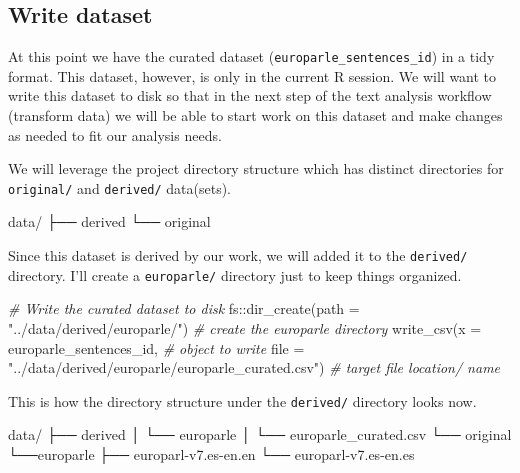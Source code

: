 \documentclass[
  letterpaper,
]{scrbook}
\newenvironment{Shaded}{\begin{snugshade}}{\end{snugshade}}
\newcommand{\AttributeTok}[1]{\textcolor[rgb]{0.00,0.00,0.00}{#1}}
\newcommand{\CommentTok}[1]{\textcolor[rgb]{0.00,0.00,0.00}{\textit{#1}}}
\newcommand{\ExtensionTok}[1]{\textcolor[rgb]{0.00,0.00,0.00}{#1}}
\newcommand{\FunctionTok}[1]{\textcolor[rgb]{0.00,0.00,0.00}{#1}}
\newcommand{\NormalTok}[1]{\textcolor[rgb]{0.00,0.00,0.00}{#1}}
\newcommand{\SpecialCharTok}[1]{\textcolor[rgb]{0.00,0.00,0.00}{#1}}
\newcommand{\StringTok}[1]{\textcolor[rgb]{0.00,0.00,0.00}{#1}}
\begin{document}
\hypertarget{write-dataset}{%
\subsection{Write dataset}\label{write-dataset}}

At this point we have the curated dataset
(\texttt{europarle\_sentences\_id}) in a tidy format. This dataset,
however, is only in the current R session. We will want to write this
dataset to disk so that in the next step of the text analysis workflow
(transform data) we will be able to start work on this dataset and make
changes as needed to fit our analysis needs.

We will leverage the project directory structure which has distinct
directories for \texttt{original/} and \texttt{derived/} data(sets).

\begin{Shaded}
\begin{Highlighting}[]
\ExtensionTok{data/}
\ExtensionTok{├──}\NormalTok{ derived}
\ExtensionTok{└──}\NormalTok{ original}
\end{Highlighting}
\end{Shaded}

Since this dataset is derived by our work, we will added it to the
\texttt{derived/} directory. I'll create a \texttt{europarle/} directory
just to keep things organized.

\begin{Shaded}
\begin{Highlighting}[]
\CommentTok{\# Write the curated dataset to disk}
\NormalTok{fs}\SpecialCharTok{::}\FunctionTok{dir\_create}\NormalTok{(}\AttributeTok{path =} \StringTok{"../data/derived/europarle/"}\NormalTok{) }\CommentTok{\# create the europarle directory}
\FunctionTok{write\_csv}\NormalTok{(}\AttributeTok{x =}\NormalTok{ europarle\_sentences\_id, }\CommentTok{\# object to write}
          \AttributeTok{file =} \StringTok{"../data/derived/europarle/europarle\_curated.csv"}\NormalTok{) }\CommentTok{\# target file location/ name}
\end{Highlighting}
\end{Shaded}

This is how the directory structure under the \texttt{derived/}
directory looks now.

\begin{Shaded}
\begin{Highlighting}[]
\ExtensionTok{data/}
\ExtensionTok{├──}\NormalTok{ derived}
\ExtensionTok{│}\NormalTok{   └── europarle}
\ExtensionTok{│}\NormalTok{       └── europarle\_curated.csv}
\ExtensionTok{└──}\NormalTok{ original}
    \ExtensionTok{└──europarle}
        \ExtensionTok{├──}\NormalTok{ europarl{-}v7.es{-}en.en}
        \ExtensionTok{└──}\NormalTok{ europarl{-}v7.es{-}en.es}
\end{Highlighting}
\end{Shaded}
\end{document}
